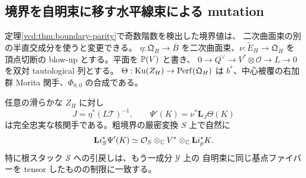 \subsection{境界を自明束に移す水平線束による mutation}
\label{vbm:sec:mutation}
定理\ref{vcd:thm:boundary-parity}で奇数階数を検出した境界値は、
二次曲面束の別の半直交成分を使うと変更できる。
$\eta:\mathfrak Q_H\to\bar B$ を二次曲面束、$\nu:\widetilde E_H\to\mathfrak Q_H$
を頂点切断の blow-up とする。平面を $\mathbb P(V)$ と書き、
$0\to Q^\vee\to V^*\otimes\mathcal O\to L\to0$ を双対 tautological 列とする。
$\Theta:\operatorname{Ku}(Z_H)\to\operatorname{Perf}(\mathfrak Q_H)$ は
$b^*$、中心被覆の右加群 Morita 関手、$\Phi_{0,0}$ の合成である。
\begin{theorem}\label{vbm:thm:horizontal}
任意の滑らかな $Z_H$ に対し
\[
 J=\eta^*(L\mathcal T)^{-1},\qquad
 \Psi'(K)=\nu^*\mathbf L_J\Theta(K)
\]
は完全忠実な核関手である。粗境界の厳密変換 $S$ 上で自然に
\[
 {\bf L}i_S^*\Psi'(K)\simeq
       \mathcal O_S\otimes_{\mathbb C}V^*\otimes_{\mathbb C}{\bf L}i_p^*K .
\]
特に根スタック $\mathcal S$ への引戻しは、もう一成分 $\mathcal Y$ 上の
自明束に同じ基点ファイバーを tensor したものの制限に一致する。
\end{theorem}
